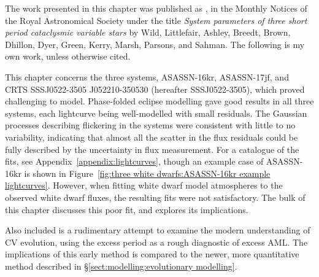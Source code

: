 \label{chpt:results:three peculiar white dwarfs} %


The work presented in this chapter was published as \cite{wild2021}, in the Monthly Notices of the Royal Astronomical Society under the title \textit{System parameters of three short period cataclysmic variable stars} by Wild, Littlefair, Ashley, Breedt, Brown, Dhillon, Dyer, Green, Kerry, Marsh, Parsons, and Sahman.
The following is my own work, unless otherwise cited.

This chapter concerns the three systems, ASASSN-16kr, ASASSN-17jf, and CRTS SSSJ0522-3505 J052210-350530 (hereafter SSSJ0522-3505), which proved challenging to model.
Phase-folded eclipse modelling gave good results in all three systems, each lightcurve being well-modelled with small residuals.
The Gaussian processes describing flickering in the systems were consistent with little to no variability, indicating that almost all the scatter in the flux residuals could be fully described by the uncertainty in flux measurement.
For a catalogue of the fits, see Appendix~\ref{appendix:lightcurves}, though an example case of ASASSN-16kr is shown in Figure~\ref{fig:three white dwarfs:ASASSN-16kr example lightcurves}.
However, when fitting white dwarf model atmospheres to the observed white dwarf fluxes, the resulting fits were not satisfactory. The bulk of this chapter discusses this poor fit, and explores its implications.

Also included is a rudimentary attempt to examine the modern understanding of CV evolution, using the excess period as a rough diagnostic of excess AML. The implications of this early method is compared to the newer, more quantitative method described in \S\ref{sect:modelling:evolutionary modelling}.

